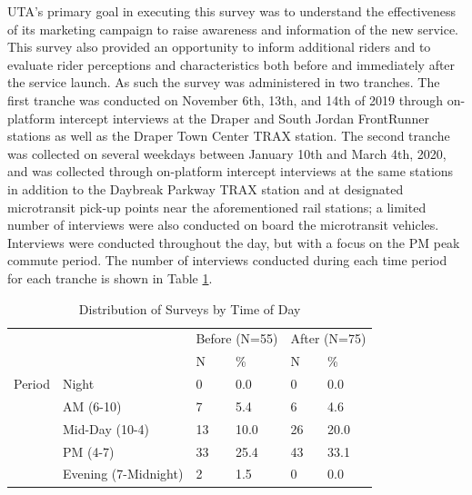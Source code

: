\documentclass[smartcities,article,submit,moreauthors,pdftex]{mdpi}
\begin{document}
UTA's primary goal in executing this survey was to understand the effectiveness
of its marketing campaign to raise awareness and information of the new service.
This survey also provided an opportunity to inform additional riders and to
evaluate rider perceptions and characteristics both before and immediately after
the service launch. As such the survey was administered in two tranches. The
first tranche was conducted on November 6th, 13th, and 14th of 2019 through
on-platform intercept interviews at the Draper and South Jordan FrontRunner
stations as well as the Draper Town Center TRAX station. The second tranche was
collected on several weekdays between January 10th and March 4th, 2020, and was
collected through on-platform intercept interviews at the same stations in
addition to the Daybreak Parkway TRAX station and at designated microtransit
pick-up points near the aforementioned rail stations; a limited number of
interviews were also conducted on board the microtransit vehicles. Interviews
were conducted throughout the day, but with a focus on the PM peak commute
period. The number of interviews conducted during each time period for each
tranche is shown in Table \ref{tab:survey-times}.

\begin{table}

\caption{\label{tab:survey-times}Distribution of Surveys by Time of Day}
\centering
\begin{tabular}[t]{llllll}
\toprule
\multicolumn{2}{c}{ } & \multicolumn{2}{c}{Before (N=55)} & \multicolumn{2}{c}{After (N=75)} \\
\cmidrule(l{3pt}r{3pt}){3-4} \cmidrule(l{3pt}r{3pt}){5-6}
  &    & N & \% & N  & \% \\
\midrule
Period & Night & 0 & 0.0 & 0 & 0.0\\
 & AM (6-10) & 7 & 5.4 & 6 & 4.6\\
 & Mid-Day (10-4) & 13 & 10.0 & 26 & 20.0\\
 & PM (4-7) & 33 & 25.4 & 43 & 33.1\\
 & Evening (7-Midnight) & 2 & 1.5 & 0 & 0.0\\
\bottomrule
\end{tabular}
\end{table}
\end{document}
